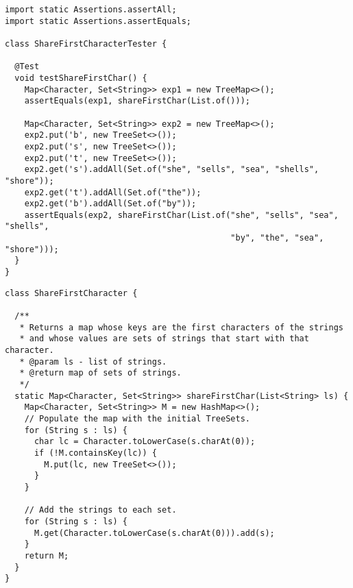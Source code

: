 \begin{cl}[]{}
\begin{lstlisting}[language=MyJava]
import static Assertions.assertAll;
import static Assertions.assertEquals;

class ShareFirstCharacterTester {
  
  @Test
  void testShareFirstChar() {
    Map<Character, Set<String>> exp1 = new TreeMap<>();
    assertEquals(exp1, shareFirstChar(List.of()));

    Map<Character, Set<String>> exp2 = new TreeMap<>();
    exp2.put('b', new TreeSet<>());
    exp2.put('s', new TreeSet<>());
    exp2.put('t', new TreeSet<>());
    exp2.get('s').addAll(Set.of("she", "sells", "sea", "shells", "shore"));
    exp2.get('t').addAll(Set.of("the"));
    exp2.get('b').addAll(Set.of("by"));
    assertEquals(exp2, shareFirstChar(List.of("she", "sells", "sea", "shells", 
                                              "by", "the", "sea", "shore")));
  }
}
\end{lstlisting}
\end{cl}

\begin{cl}[]{}
\begin{lstlisting}[language=MyJava]
class ShareFirstCharacter {

  /**
   * Returns a map whose keys are the first characters of the strings
   * and whose values are sets of strings that start with that character.
   * @param ls - list of strings.
   * @return map of sets of strings.
   */
  static Map<Character, Set<String>> shareFirstChar(List<String> ls) {
    Map<Character, Set<String>> M = new HashMap<>();
    // Populate the map with the initial TreeSets.
    for (String s : ls) {
      char lc = Character.toLowerCase(s.charAt(0));
      if (!M.containsKey(lc)) {
        M.put(lc, new TreeSet<>());
      }
    }

    // Add the strings to each set.
    for (String s : ls) {
      M.get(Character.toLowerCase(s.charAt(0))).add(s);
    }
    return M;
  }
}
\end{lstlisting}
\end{cl}


